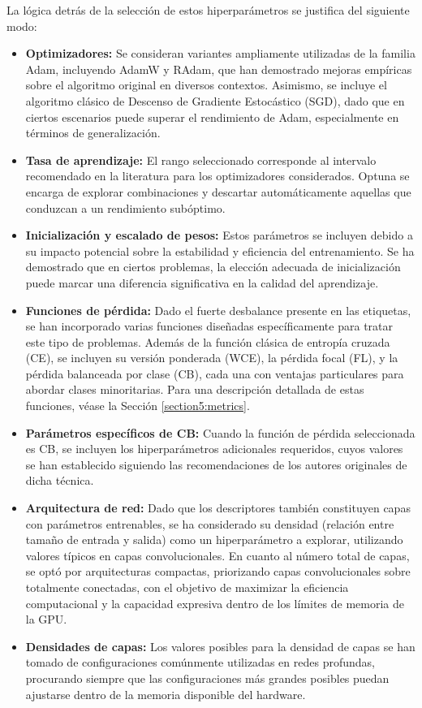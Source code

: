 La lógica detrás de la selección de estos hiperparámetros se justifica del siguiente modo:
\begin{itemize}
    \item \textbf{Optimizadores:} Se consideran variantes ampliamente utilizadas de la familia Adam, incluyendo AdamW y RAdam, que han demostrado mejoras empíricas sobre el algoritmo original en diversos contextos. Asimismo, se incluye el algoritmo clásico de Descenso de Gradiente Estocástico (SGD), dado que en ciertos escenarios puede superar el rendimiento de Adam, especialmente en términos de generalización.
    \item \textbf{Tasa de aprendizaje:} El rango seleccionado corresponde al intervalo recomendado en la literatura para los optimizadores considerados. Optuna se encarga de explorar combinaciones y descartar automáticamente aquellas que conduzcan a un rendimiento subóptimo. 
    \item \textbf{Inicialización y escalado de pesos:} Estos parámetros se incluyen debido a su impacto potencial sobre la estabilidad y eficiencia del entrenamiento. Se ha demostrado que en ciertos problemas, la elección adecuada de inicialización puede marcar una diferencia significativa en la calidad del aprendizaje.
    \item \textbf{Funciones de pérdida:} Dado el fuerte desbalance presente en las etiquetas, se han incorporado varias funciones diseñadas específicamente para tratar este tipo de problemas. Además de la función clásica de entropía cruzada (CE), se incluyen su versión ponderada (WCE), la pérdida focal (FL), y la pérdida balanceada por clase (CB), cada una con ventajas particulares para abordar clases minoritarias. Para una descripción detallada de estas funciones, véase la Sección \ref{section5:metrics}.
    \item \textbf{Parámetros específicos de CB:} Cuando la función de pérdida seleccionada es CB, se incluyen los hiperparámetros adicionales requeridos, cuyos valores se han establecido siguiendo las recomendaciones de los autores originales de dicha técnica.
    \item \textbf{Arquitectura de red:} Dado que los descriptores también constituyen capas con parámetros entrenables, se ha considerado su densidad (relación entre tamaño de entrada y salida) como un hiperparámetro a explorar, utilizando valores típicos en capas convolucionales. En cuanto al número total de capas, se optó por arquitecturas compactas, priorizando capas convolucionales sobre totalmente conectadas, con el objetivo de maximizar la eficiencia computacional y la capacidad expresiva dentro de los límites de memoria de la GPU.
    \item \textbf{Densidades de capas:} Los valores posibles para la densidad de capas se han tomado de configuraciones comúnmente utilizadas en redes profundas, procurando siempre que las configuraciones más grandes posibles puedan ajustarse dentro de la memoria disponible del hardware.
\end{itemize}

